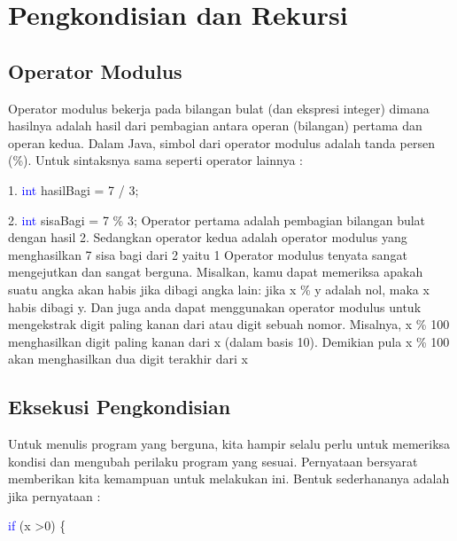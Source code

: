 \chapter{Pengkondisian dan Rekursi}

\section{Operator Modulus}

Operator modulus bekerja pada bilangan bulat (dan ekspresi integer) dimana hasilnya adalah hasil dari pembagian antara operan (bilangan) pertama dan operan kedua. Dalam Java, simbol dari operator modulus adalah tanda persen (\%). Untuk sintaksnya sama seperti operator lainnya :
\par
1. \textcolor{blue}{int} hasilBagi = 7 / 3;
\par
2. \textcolor{blue}{int} sisaBagi = 7 \% 3;
\newline
\newline
Operator pertama adalah pembagian bilangan bulat dengan hasil 2. Sedangkan operator kedua adalah operator modulus yang menghasilkan 7 sisa bagi dari 2 yaitu 1
\newline
\newline
Operator modulus tenyata sangat mengejutkan dan sangat berguna. Misalkan, kamu dapat memeriksa apakah suatu angka akan habis jika dibagi angka lain: jika x \% y adalah nol, maka x habis dibagi y.
\newline
\newline
Dan juga anda dapat menggunakan operator modulus untuk mengekstrak digit paling kanan dari atau digit sebuah nomor. Misalnya, x \% 100 menghasilkan digit paling kanan dari x (dalam basis 10). Demikian pula x \% 100 akan menghasilkan dua digit terakhir dari x


\section{Eksekusi Pengkondisian}
Untuk menulis program yang berguna, kita hampir selalu perlu untuk memeriksa kondisi dan mengubah perilaku program yang sesuai. Pernyataan bersyarat memberikan kita kemampuan untuk melakukan ini. Bentuk sederhananya adalah jika pernyataan : 
\par
\textcolor{blue}{if} (x \textgreater 0) \{
\par

